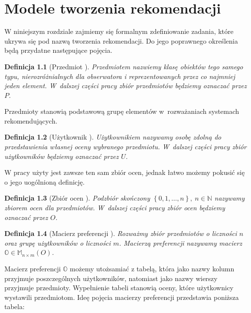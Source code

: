 \documentclass[12pt,a4paper]{report}
\newtheorem{df}{Definicja}[chapter]
\newcommand{\set}[1]{\left\lbrace {#1} \right\rbrace}
\newcommand{\setN}{\mathbb{N}}
\newcommand{\setUzytkownicy}{\mathit{U}}
\newcommand{\setPrzedmioty}{\mathit{P}}
\newcommand{\setOceny}{\mathit{O}}
\begin{document}
\chapter{Modele tworzenia rekomendacji}

W niniejszym rozdziale zajmiemy się formalnym zdefiniowanie zadania, które ukrywa się pod nazwą tworzenia rekomendacji. Do jego poprawnego określenia będą przydatne następujące pojęcia.

\begin{df}[Przedmiot {\citep[Sec 1.3]{kidzinski}}]
 Przedmiotem nazwiemy klasę obiektów tego samego typu, nierozróżnialnych dla obserwatora i reprezentowanych przez co najmniej jeden element. W~dalszej części pracy zbiór przedmiotów będziemy oznaczać przez $\setPrzedmioty$.
\end{df}

Przedmioty stanowią podstawową grupę elementów w~rozważaniach systemach rekomendujących. 

\begin{df}[Użytkownik {\citep[Sec 1.3]{kidzinski}}]
Użytkownikiem nazywamy osobę zdolną do przedstawienia własnej oceny wybranego przedmiotu. W~dalszej części pracy zbiór użytkowników będziemy oznaczać przez $\setUzytkownicy$.
\end{df}

W pracy \citep{kidzinski} użyty jest zawsze ten sam zbiór ocen, jednak łatwo możemy pokusić się o jego uogólnioną definicję.

\begin{df}[Zbiór ocen {\citep[Sec 1.3]{kidzinski}}]
Podzbiór skończony $\set{0,1, \ldots, n}, \: n\in \setN$ nazywamy zbiorem ocen dla przedmiotów. W~dalszej części pracy zbiór ocen będziemy oznaczać przez $\setOceny$.
\end{df} 

\begin{df}[Macierz preferencji {\citep[Sec 1.3]{kidzinski}}]
Rozważmy zbiór przedmiotów o liczności $n$ oraz grupę użytkowników o liczności $m$. Macierzą preferencji nazywamy macierz $\mathbb{O} \in \mathbb{M}_{n \times m}(\setOceny)$.
\end{df}

Macierz preferencji $\mathbb{O}$ możemy utożsamiać z tabelą, która jako nazwy kolumn przyjmuje poszczególnych użytkowników, natomiast jako nazwy wierszy przyjmuje przedmioty. Wypełnienie tabeli stanowią oceny, które użytkownicy wystawili przedmiotom. Ideę pojęcia macierzy preferencji przedstawia poniższa tabela:
\end{document}
